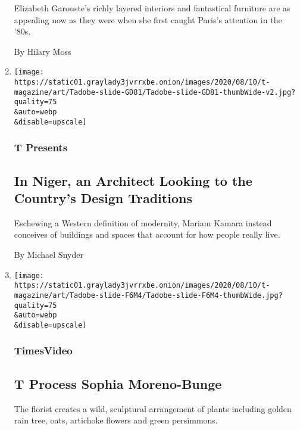 \begin{enumerate}
  Elizabeth Garouste's richly layered interiors and fantastical
  furniture are as appealing now as they were when she first caught
  Paris's attention in the '80s.

  By Hilary Moss
\item
  \href{/2020/08/10/t-magazine/mariam-kamara-architect-design.html}{}

  \texttt{[image: https://static01.graylady3jvrrxbe.onion/images/2020/08/10/t-magazine/art/Tadobe-slide-GD81/Tadobe-slide-GD81-thumbWide-v2.jpg?quality=75\\\&auto=webp\\\&disable=upscale]}

  \hypertarget{t-presents-2}{%
  \subsubsection{T Presents}\label{t-presents-2}}

  \hypertarget{in-niger-an-architect-looking-to-the-countrys-design-traditions}{%
  \subsection{In Niger, an Architect Looking to the Country's Design
  Traditions}\label{in-niger-an-architect-looking-to-the-countrys-design-traditions}}

  Eschewing a Western definition of modernity, Mariam Kamara instead
  conceives of buildings and spaces that account for how people really
  live.

  By Michael Snyder
\item
  \href{/video/t-magazine/design/100000007258999/t-process-sophia-moreno-bunge.html}{}

  \texttt{[image: https://static01.graylady3jvrrxbe.onion/images/2020/08/10/t-magazine/art/Tadobe-slide-F6M4/Tadobe-slide-F6M4-thumbWide.jpg?quality=75\\\&auto=webp\\\&disable=upscale]}

  \hypertarget{timesvideo}{%
  \subsubsection{TimesVideo}\label{timesvideo}}

  \hypertarget{t-process--sophia-moreno-bunge}{%
  \subsection{T Process \textbar{} Sophia
  Moreno-Bunge}\label{t-process--sophia-moreno-bunge}}

  The florist creates a wild, sculptural arrangement of plants including
  golden rain tree, oats, artichoke flowers and green persimmons.


\end{enumerate}
